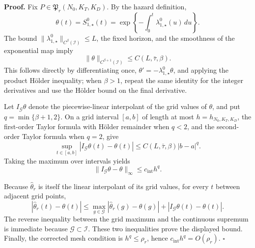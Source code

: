 \textbf{Proof.}
Fix \(P\in\mathfrak P_r(N_0,K_T,K_D)\).  By the hazard definition,
\[
 \theta(t)=S^0_{1,\star}(t)
 =\exp\left\{-\int_0^t\lambda^0_{1,\star}(u)\,du\right\}.
\]
The bound \(\|\lambda^0_{1,\star}\|_{C^\beta(\mathcal I)}\le L\), the fixed horizon, and the smoothness of the exponential map imply
\[
 \|\theta\|_{C^{\beta+1}(\mathcal I)}\le C(L,\bar\tau,\beta).
\]
This follows directly by differentiating once, \(\theta'=-\lambda^0_{1,\star}\theta\), and applying the product Hölder inequality; when \(\beta>1\), repeat the same identity for the integer derivatives and use the Hölder bound on the final derivative.

Let \(I_{\mathcal G}\theta\) denote the piecewise-linear interpolant of the grid values of \(\theta\), and put \(q=\min\{\beta+1,2\}\).  On a grid interval \([a,b]\) of length at most \(h=h_{N_0,K_T,K_D}\), the first-order Taylor formula with Hölder remainder when \(q<2\), and the second-order Taylor formula when \(q=2\), give
\[
 \sup_{t\in[a,b]}|I_{\mathcal G}\theta(t)-\theta(t)|
 \le C(L,\bar\tau,\beta)|b-a|^q.
\]
Taking the maximum over intervals yields
\[
 \|I_{\mathcal G}\theta-\theta\|_\infty\le c_{\mathrm{int}}h^q.
\]

Because \(\widehat\theta_r\) is itself the linear interpolant of its grid values, for every \(t\) between adjacent grid points,
\[
 |\widehat\theta_r(t)-\theta(t)|
 \le \max_{g\in\mathcal G}|\widehat\theta_r(g)-\theta(g)|
 +|I_{\mathcal G}\theta(t)-\theta(t)|.
\]
The reverse inequality between the grid maximum and the continuous supremum is immediate because \(\mathcal G\subset\mathcal I\).  These two inequalities prove the displayed bound.  Finally, the corrected mesh condition is \(h^q\le\rho_r\), hence \(c_{\mathrm{int}}h^q=O(\rho_r)\). \(\square\)